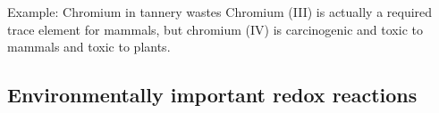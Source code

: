 \documentclass[a4paper,titlepage]{article}
\begin{document}
\begin{frame}
\begin{exampleblock}{Example: Chromium in tannery wastes}
{\smallskip Chromium (III) is actually a required trace element for mammals, but chromium (IV) is carcinogenic and toxic to mammals and toxic to plants.
}
\end{exampleblock}
\end{frame}

\subsection{Environmentally important redox reactions}
\end{document}
